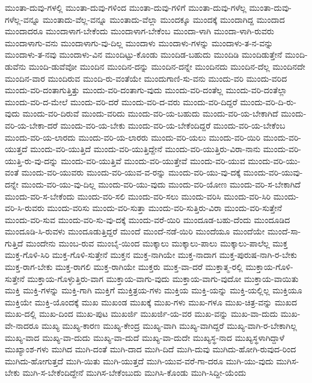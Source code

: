 {ಮುಂತಾ-ದುವು-ಗಳಲ್ಲಿ
ಮುಂತಾ-ದುವು-ಗಳಿಂದ
ಮುಂತಾ-ದುವು-ಗಳಿಗೆ
ಮುಂತಾ-ದುವು-ಗಳೆಲ್ಲ
ಮುಂತಾ-ದುವು-ಗಳೆಲ್ಲ-ವನ್ನೂ
ಮುಂತಾದು-ವೆಲ್ಲ-ವನ್ನೂ
ಮುಂತಾದು-ವೆಲ್ಲಾ
ಮುಂದಕ್ಕೂ
ಮುಂದಕ್ಕೆ
ಮುಂದಾಗಿದ್ದ
ಮುಂದಾದ
ಮುಂದಾದರೂ
ಮುಂದಾಳಾಗ-ಬೇಕೆಂದು
ಮುಂದಾಳಾಗ-ಬೇಕೆಂಬ
ಮುಂದಾ-ಳಾಗಿ
ಮುಂದಾ-ಳಾಗಿ-ರುವರು
ಮುಂದಾಳಾಗು-ವನು
ಮುಂದಾಳಾಗು-ವು-ದಿಲ್ಲ
ಮುಂದಾಳು
ಮುಂದಾಳು-ಗಳನ್ನು
ಮುಂದಾಳು-ತ-ನ-ವನ್ನು
ಮುಂದಾಳು-ತ-ನವು
ಮುಂದಾಳು-ವಿನ
ಮುಂದಿಟ್ಟು-ಕೊಂಡು
ಮುಂದಿಡ-ಬಹುದು
ಮುಂದಿಡಿ
ಮುಂದಿಡುತ್ತೇನೆ
ಮುಂದಿ-ಡುವೆನು
ಮುಂದಿ-ಡುವೆವೋ
ಮುಂದಿನ
ಮುಂದಿನ-ದನ್ನು
ಮುಂದಿನ-ದನ್ನೇ
ಮುಂದಿನದು
ಮುಂದಿನ-ದೆಲ್ಲ
ಮುಂದಿನದೇ
ಮುಂದಿನ-ವಾರ
ಮುಂದಿರುವ
ಮುಂದಿ-ರು-ವಂತೆಯೇ
ಮುಂದುಗಾಣಿ-ಸು-ವನು
ಮುಂದು-ವರಿ
ಮುಂದು-ವರಿದ
ಮುಂದು-ವರಿ-ದಂತಾಗುತ್ತಿತ್ತು
ಮುಂದು-ವರಿ-ದಂತಾಗು-ವುದು
ಮುಂದು-ವರಿ-ದಂತೆಲ್ಲ
ಮುಂದು-ವರಿ-ದಂತೆಲ್ಲಾ
ಮುಂದು-ವರಿ-ದ-ಮೇಲೆ
ಮುಂದು-ವರಿ-ದರೆ
ಮುಂದು-ವರಿ-ದ-ವರು
ಮುಂದು-ವರಿ-ದಿದ್ದರೆ
ಮುಂದು-ವರಿ-ದಿ-ರು-ವುದು
ಮುಂದು-ವರಿ-ದಿರುವೆ
ಮುಂದು-ವರಿದು
ಮುಂದು-ವರಿ-ಯ-ಬಹುದು
ಮುಂದು-ವರಿ-ಯ-ಬೇಕಾಗಿದೆ
ಮುಂದು-ವರಿ-ಯ-ಬೇಕಾ-ದರೆ
ಮುಂದು-ವರಿ-ಯ-ಬೇಕು
ಮುಂದು-ವರಿ-ಯ-ಬೇಕೆಂದಿದ್ದರೆ
ಮುಂದು-ವರಿ-ಯ-ಬೇಕೆಂಬ
ಮುಂದು-ವರಿ-ಯ-ಲಾರದು
ಮುಂದು-ವರಿ-ಯ-ಲಾರರು
ಮುಂದು-ವರಿ-ಯಲು
ಮುಂದು-ವರಿ-ಯಿರಿ
ಮುಂದು-ವರಿ-ಯುತ್ತದೆ
ಮುಂದು-ವರಿ-ಯುತ್ತಿದೆ
ಮುಂದು-ವರಿ-ಯುತ್ತಿದ್ದೇನೆ
ಮುಂದು-ವರಿ-ಯುತ್ತಿರು-ವಿರಾ-ನಾನು
ಮುಂದು-ವರಿ-ಯುತ್ತಿ-ರು-ವು-ದನ್ನು
ಮುಂದು-ವರಿ-ಯುತ್ತಿವೆ
ಮುಂದು-ವರಿ-ಯುತ್ತೇವೆ
ಮುಂದು-ವರಿ-ಯುವ
ಮುಂದು-ವರಿ-ಯು-ವಂತೆ
ಮುಂದು-ವರಿ-ಯುವರು
ಮುಂದು-ವರಿ-ಯುವ-ವ-ರನ್ನು
ಮುಂದು-ವರಿ-ಯು-ವು-ದಕ್ಕೆ
ಮುಂದು-ವರಿ-ಯುವು-ದನ್ನೇ
ಮುಂದು-ವರಿ-ಯು-ವು-ದಿಲ್ಲ
ಮುಂದು-ವರಿ-ಯು-ವುದು
ಮುಂದು-ವರಿ-ಯೋಣ
ಮುಂದು-ವರಿ-ಸ-ಬೇಕಾಗಿದೆ
ಮುಂದು-ವರಿ-ಸ-ಬೇಕೆಂದು
ಮುಂದು-ವರಿ-ಸಲಿ
ಮುಂದು-ವರಿ-ಸಲು
ಮುಂದು-ವರಿಸಿ
ಮುಂದು-ವರಿ-ಸಿರಿ
ಮುಂದು-ವರಿ-ಸಿ-ರುವರು
ಮುಂದು-ವರಿಸು
ಮುಂದು-ವರಿ-ಸುತ್ತಾ
ಮುಂದು-ವರಿ-ಸುತ್ತಿರು-ವಿರಾ
ಮುಂದು-ವರಿ-ಸುತ್ತೇನೆ
ಮುಂದು-ವರಿ-ಸುವ
ಮುಂದು-ವರಿ-ಸು-ವು-ದಕ್ಕೆ
ಮುಂದು-ವರೆ-ಯಿರಿ
ಮುಂದೂಡ-ಬಹು-ದೆಂದು
ಮುಂದೂಡಿದ
ಮುಂದೂಡಿ-ಸಿ-ರುವಳು
ಮುಂದೂಡುತ್ತಿದ್ದರೆ
ಮುಂದೆ
ಮುಂದೆ-ನಡೆ-ಯಿರಿ
ಮುಂದೆಯೂ
ಮುಂದೆಯೇ
ಮುಂದೆ-ಸಾ-ಗುತ್ತಿದೆ
ಮುಂದೇನು
ಮುಂಬ-ರುವ
ಮುಂಬೈ-ಯಿಂದ
ಮುಕ್ಕಾಲು
ಮುಕ್ಕಾಲು-ಪಾಲು
ಮುಕ್ಕಾಲು-ಪಾಲೆಲ್ಲ
ಮುಕ್ತ
ಮುಕ್ತ-ಗೊಳಿ-ಸಿರಿ
ಮುಕ್ತ-ಗೊಳಿ-ಸುತ್ತೇನೆ
ಮುಕ್ತನ
ಮುಕ್ತ-ನಾಗಿಯೇ
ಮುಕ್ತ-ನಾದಾಗ
ಮುಕ್ತ-ಪುರುಷ-ನಾಗಿ-ರ-ಬೇಕು
ಮುಕ್ತ-ರಾಗ-ಬೇಕು
ಮುಕ್ತ-ರಾಗಲಿ
ಮುಕ್ತ-ರಾಗಿಯೇ
ಮುಕ್ತರು
ಮುಕ್ತ-ವಾ-ದರೆ
ಮುಕ್ತಾತ್ಮ-ರಲ್ಲಿ
ಮುಕ್ತಾಯ-ಗೊಳಿ-ಸುತ್ತೇನೆ
ಮುಕ್ತಾಯ-ಗೊಳ್ಳುತ್ತಿರು-ವಾಗ
ಮುಕ್ತಾಯ-ವಾಗು-ವುದು
ಮುಕ್ತಾಯ-ವಾಗು-ವುದೋ
ಮುಕ್ತಾಯ-ವಾಯಿತು
ಮುಕ್ತಿ
ಮುಕ್ತಿ-ಗಳನ್ನು
ಮುಕ್ತಿ-ಗಾಗಿ
ಮುಕ್ತಿಗೆ
ಮುಕ್ತಿತ್ರಯ-ಗಳು
ಮುಕ್ತಿಯ
ಮುಕ್ತಿ-ಯನ್ನು
ಮುಕ್ತಿ-ಯಲ್ಲಿಲ್ಲ
ಮುಕ್ತಿಯೂ
ಮುಕ್ತಿಯೇ
ಮುಕ್ತಿ-ಯೊಂದಕ್ಕೆ
ಮುಖ
ಮುಖಂಡ
ಮುಖಕ್ಕೆ
ಮುಖ-ಗಳು
ಮುಖ-ಗಳೂ
ಮುಖ-ಚಿತ್ರ-ವನ್ನು
ಮುಖದ
ಮುಖ-ದಲ್ಲಿ
ಮುಖ-ದಿಂದ
ಮುಖ-ಪುಟ
ಮುಖರ್ಜಿ
ಮುಖರ್ಜಿ-ಯ-ವರ
ಮುಖ-ವನ್ನು
ಮುಖ-ವಾ-ದುದು
ಮುಖ-ವೇ-ನಾದರೂ
ಮುಖ್ಯ
ಮುಖ್ಯ-ಕಾರಣ
ಮುಖ್ಯ-ಕೇಂದ್ರ
ಮುಖ್ಯ-ವಾಗಿ
ಮುಖ್ಯ-ವಾಗಿದ್ದರೆ
ಮುಖ್ಯ-ವಾಗಿ-ರ-ಬೇಕಾಗಿಲ್ಲ
ಮುಖ್ಯ-ವಾದ
ಮುಖ್ಯ-ವಾ-ದುದು
ಮುಖ್ಯ-ವಾ-ದುದೆ
ಮುಖ್ಯ-ವಾ-ದುದೇ
ಮುಖ್ಯಸ್ಥ-ನಾದ
ಮುಖ್ಯಸ್ಥಳಾಗಿದ್ದಾಳೆ
ಮುಖ್ಯಾಂಶ-ಗಳು
ಮುಗಿದ
ಮುಗಿ-ದಂತೆ
ಮುಗಿ-ದಾದ
ಮುಗಿ-ದಿದೆ
ಮುಗಿ-ದುವು
ಮುಗಿದು-ಹೋಗಿ-ರುವುದ-ರಿಂದ
ಮುಗಿದು-ಹೋಗುತ್ತದೆ
ಮುಗಿ-ಯಿತು
ಮುಗಿ-ಯುತ್ತದೆ
ಮುಗಿ-ಯುವ-ವರೆ-ಗಾ-ದರೂ
ಮುಗಿ-ಯು-ವುದು
ಮುಗಿಸ-ಬೇಕು
ಮುಗಿ-ಸ-ಬೇಕೆಂದಿದ್ದೇನೆ
ಮುಗಿಸ-ಬೇಕೆಂಬುದು
ಮುಗಿಸಿ-ಕೊಂಡು
ಮುಗಿ-ಸಿದ್ದೀ-ಯೆಂದು
}
